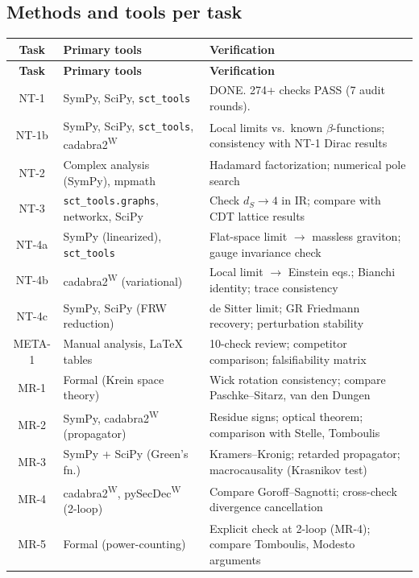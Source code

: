 \documentclass[12pt,a4paper]{article}
\begin{document}
\subsection{Methods and tools per task}

\begin{longtable}{clp{6.5cm}}
\toprule
\textbf{Task} & \textbf{Primary tools} & \textbf{Verification} \\
\midrule
\endfirsthead
\toprule
\textbf{Task} & \textbf{Primary tools} & \textbf{Verification} \\
\midrule
\endhead
NT-1 & SymPy, SciPy, \texttt{sct\_tools} & \textcolor{proven}{DONE.} 274+ checks PASS (7 audit rounds). \\
NT-1b & SymPy, SciPy, \texttt{sct\_tools}, cadabra2\textsuperscript{W} & Local limits vs.\ known $\beta$-functions; consistency with NT-1 Dirac results \\
NT-2 & Complex analysis (SymPy), mpmath & Hadamard factorization; numerical pole search \\
NT-3 & \texttt{sct\_tools.graphs}, networkx, SciPy & Check $d_S \to 4$ in IR; compare with CDT lattice results \\
NT-4a & SymPy (linearized), \texttt{sct\_tools} & Flat-space limit $\to$ massless graviton; gauge invariance check \\
NT-4b & cadabra2\textsuperscript{W} (variational) & Local limit $\to$ Einstein eqs.; Bianchi identity; trace consistency \\
NT-4c & SymPy, SciPy (FRW reduction) & de Sitter limit; GR Friedmann recovery; perturbation stability \\
\midrule
META-1 & Manual analysis, LaTeX tables & 10-check review; competitor comparison; falsifiability matrix \\
\midrule
MR-1 & Formal (Krein space theory) & Wick rotation consistency; compare Paschke--Sitarz, van den Dungen \\
MR-2 & SymPy, cadabra2\textsuperscript{W} (propagator) & Residue signs; optical theorem; comparison with Stelle, Tomboulis \\
MR-3 & SymPy + SciPy (Green's fn.) & Kramers--Kronig; retarded propagator; macrocausality (Krasnikov test) \\
MR-4 & cadabra2\textsuperscript{W}, pySecDec\textsuperscript{W} (2-loop) & Compare Goroff--Sagnotti; cross-check divergence cancellation \\
MR-5 & Formal (power-counting) & Explicit check at 2-loop (MR-4); compare Tomboulis, Modesto arguments \\

\end{longtable}
\end{document}
